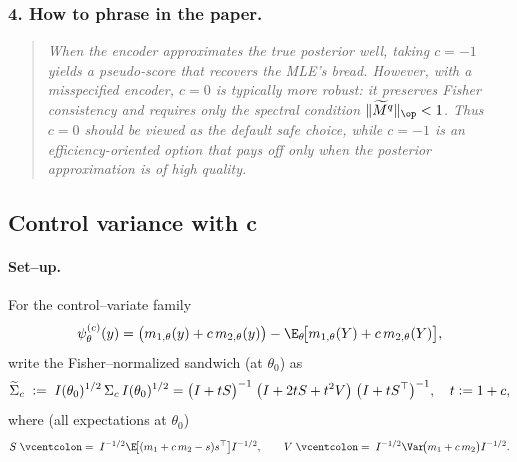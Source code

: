 \subsubsection*{4. How to phrase in the paper.}
\begin{quote}
\emph{When the encoder approximates the true posterior well, taking \(c=-1\) yields a pseudo-score that recovers the MLE’s bread. However, with a misspecified encoder, \(c=0\) is typically more robust: it preserves Fisher consistency and requires only the spectral condition $\|\widetilde M^q\|_{\op}<1$. Thus $c=0$ should be viewed as the default safe choice, while $c=-1$ is an efficiency-oriented option that pays off only when the posterior approximation is of high quality.}
\end{quote}


\subsection{Control variance with c}

\paragraph{Set–up.}
For the control–variate family
\[
\psi^{(c)}_\theta(y)
=\big(m_{1,\theta}(y)+c\,m_{2,\theta}(y)\big)
-\E_\theta\!\big[m_{1,\theta}(Y)+c\,m_{2,\theta}(Y)\big],
\]
write the Fisher–normalized sandwich (at $\theta_0$) as
\[
\widetilde\Sigma_c
\;\vcentcolon=\;
I(\theta_0)^{1/2}\,
\Sigma_c\,
I(\theta_0)^{1/2}
=
\big(I+tS\big)^{-1}\;
\big(I+2tS+t^2V\big)\;
\big(I+tS^\top\big)^{-1},
\quad t\vcentcolon=1+c,
\]
where (all expectations at $\theta_0$)
\[
S\;\vcentcolon=\;I^{-1/2}\E\!\big[(m_{1}+c\,m_{2}-s)s^\top\big]I^{-1/2},
\qquad
V\;\vcentcolon=\;I^{-1/2}\Var\!\big(m_{1}+c\,m_{2}\big)I^{-1/2}.
\]


